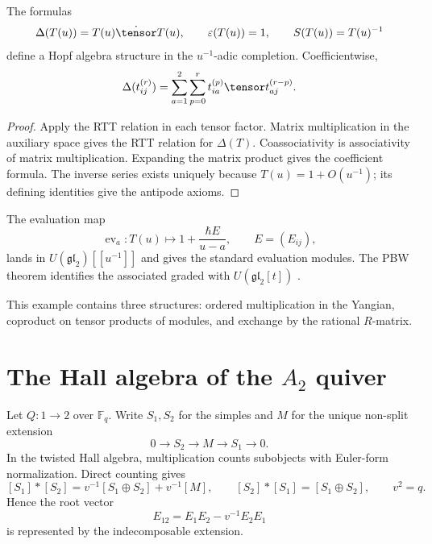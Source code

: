 \begin{theorem}
The formulas
\[
 \Delta(T(u))=T(u)\dot\tensor T(u),\qquad
 \varepsilon(T(u))=1,\qquad
 S(T(u))=T(u)^{-1}
\]
define a Hopf algebra structure in the $u^{-1}$-adic completion. Coefficientwise,
\[
 \Delta(t_{ij}^{(r)})
 =\sum_{a=1}^{2}\sum_{p=0}^{r}
 t_{ia}^{(p)}\tensor t_{aj}^{(r-p)}.
\]
\end{theorem}
\begin{proof}
Apply the RTT relation in each tensor factor. Matrix multiplication in the auxiliary space gives the RTT relation for $\Delta(T)$. Coassociativity is associativity of matrix multiplication. Expanding the matrix product gives the coefficient formula. The inverse series exists uniquely because $T(u)=1+O(u^{-1})$; its defining identities give the antipode axioms.
\end{proof}

The evaluation map
\[
 \operatorname{ev}_a:T(u)\longmapsto 1+\frac{\hbar E}{u-a},
 \qquad E=(E_{ij}),
\]
lands in $U(\mathfrak{gl}_2)[[u^{-1}]]$ and gives the standard evaluation modules. The PBW theorem identifies the associated graded with $U(\mathfrak{gl}_2[t])$ \cite{Molev,DrinfeldYangian}.

This example contains three structures: ordered multiplication in the Yangian, coproduct on tensor products of modules, and exchange by the rational $R$-matrix.

\chapter{The Hall algebra of the \texorpdfstring{$A_2$}{A2} quiver}
Let $Q:1\to2$ over $\mathbb F_q$. Write $S_1,S_2$ for the simples and $M$ for the unique non-split extension
\[
 0\to S_2\to M\to S_1\to0.
\]
In the twisted Hall algebra, multiplication counts subobjects with Euler-form normalization. Direct counting gives
\[
 [S_1]*[S_2]=v^{-1}[S_1\oplus S_2]+v^{-1}[M],
 \qquad
 [S_2]*[S_1]=[S_1\oplus S_2],
 \qquad v^2=q.
\]
Hence the root vector
\[
 E_{12}=E_1E_2-v^{-1}E_2E_1
\]
is represented by the indecomposable extension.

